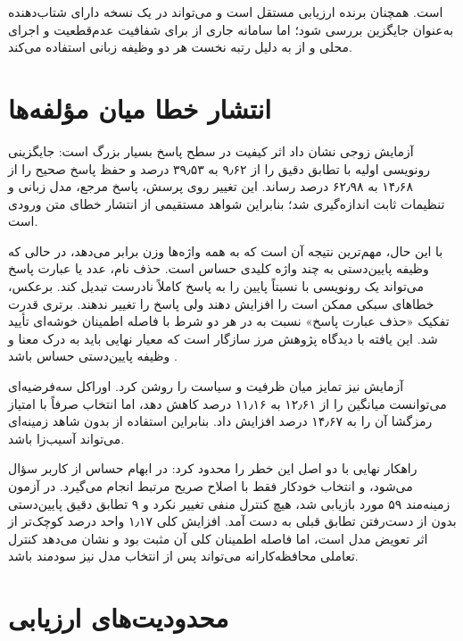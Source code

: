 است.  همچنان برنده ارزیابی مستقل
 است و می‌تواند در یک نسخه دارای شتاب‌دهنده
به‌عنوان جایگزین بررسی شود؛ اما سامانه جاری از  برای
شفافیت عدم‌قطعیت و اجرای محلی و از  به دلیل رتبه
نخست هر دو وظیفه زبانی استفاده می‌کند.


\section{انتشار خطا میان مؤلفه‌ها}

آزمایش زوجی نشان داد اثر کیفیت  در سطح پاسخ بسیار بزرگ
است: جایگزینی رونویسی اولیه با  تطابق دقیق را از ۹٫۶۲
به ۳۹٫۵۳ درصد و حفظ پاسخ صحیح را از ۱۴٫۶۸ به ۶۲٫۹۸ درصد رساند.
این تغییر روی پرسش، پاسخ مرجع، مدل زبانی و تنظیمات ثابت اندازه‌گیری
شد؛ بنابراین شواهد مستقیمی از انتشار خطای متن ورودی است.

با این حال، مهم‌ترین نتیجه آن است که  به همه واژه‌ها وزن
برابر می‌دهد، در حالی که وظیفه پایین‌دستی به چند واژه کلیدی حساس
است. حذف نام، عدد یا عبارت پاسخ می‌تواند یک رونویسی با 
نسبتاً پایین را به پاسخ کاملاً نادرست تبدیل کند. برعکس، خطاهای
سبکی ممکن است  را افزایش دهند ولی پاسخ را تغییر ندهند.
برتری قدرت تفکیک «حذف عبارت پاسخ» نسبت به  در هر دو شرط
 با فاصله اطمینان خوشه‌ای تأیید شد. این یافته با دیدگاه
پژوهش مرز  سازگار است که معیار نهایی باید به درک
معنا و وظیفه پایین‌دستی حساس باشد \cite{faruqui2022boundary}.

آزمایش  نیز تمایز میان ظرفیت و سیاست را روشن کرد.
اوراکل سه‌فرضیه‌ای می‌توانست میانگین  را از ۱۲٫۶۱ به
۱۱٫۱۶ درصد کاهش دهد، اما انتخاب صرفاً با امتیاز رمزگشا آن را به
۱۴٫۶۷ درصد افزایش داد. بنابراین استفاده از  بدون
شاهد زمینه‌ای می‌تواند آسیب‌زا باشد.

راهکار نهایی با دو اصل این خطر را محدود کرد: در ابهام حساس از
کاربر سؤال می‌شود، و انتخاب خودکار فقط با اصلاح صریح مرتبط انجام
می‌گیرد. در آزمون زمینه‌مند ۵۹ مورد بازیابی شد، هیچ کنترل منفی
تغییر نکرد و ۹ تطابق دقیق پایین‌دستی بدون از دست‌رفتن تطابق قبلی
به دست آمد. افزایش کلی ۱٫۱۷ واحد درصد کوچک‌تر از اثر تعویض مدل
 است، اما فاصله اطمینان کلی آن مثبت بود و نشان می‌دهد
کنترل تعاملی محافظه‌کارانه می‌تواند پس از انتخاب مدل نیز سودمند
باشد.


\section{محدودیت‌های ارزیابی}

